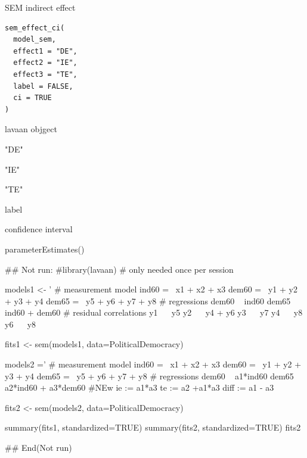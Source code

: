 \documentclass[a4paper]{book}
\begin{document}
%
\begin{Description}
SEM indirect effect
\end{Description}
%
\begin{Usage}
\begin{verbatim}
sem_effect_ci(
  model_sem,
  effect1 = "DE",
  effect2 = "IE",
  effect3 = "TE",
  label = FALSE,
  ci = TRUE
)
\end{verbatim}
\end{Usage}
%
\begin{Arguments}
\begin{ldescription}
\item[\code{model\_sem}] lavaan objgect

\item[\code{effect1}] "DE"

\item[\code{effect2}] "IE"

\item[\code{effect3}] "TE"

\item[\code{label}] label

\item[\code{ci}] confidence interval
\end{ldescription}
\end{Arguments}
%
\begin{Value}
parameterEstimates()
\end{Value}
%
\begin{Examples}
\begin{ExampleCode}

\#\# Not run: 
#library(lavaan) # only needed once per session

models1 <- '
  # measurement model
    ind60 =~ x1 + x2 + x3
    dem60 =~ y1 + y2 + y3 + y4
    dem65 =~ y5 + y6 + y7 + y8
    # regressions
    dem60 ~ ind60
    dem65 ~ ind60 + dem60
      # residual correlations
    y1 ~~ y5
    y2 ~~ y4 + y6
    y3 ~~ y7
    y4 ~~ y8
    y6 ~~ y8

fits1 <- sem(models1, data=PoliticalDemocracy)


models2 ='
  # measurement model
    ind60 =~ x1 + x2 + x3
    dem60 =~ y1 + y2 + y3 + y4
    dem65 =~ y5 + y6 + y7 + y8
     # regressions
    dem60 ~ a1*ind60
    dem65 ~ a2*ind60 + a3*dem60
 #NEw
   ie := a1*a3
   te := a2 +a1*a3
   diff := a1 - a3

fits2 <- sem(models2, data=PoliticalDemocracy)

summary(fits1, standardized=TRUE)
summary(fits2, standardized=TRUE)
fits2 %

## End(Not run)

\end{ExampleCode}
\end{Examples}
\end{document}
